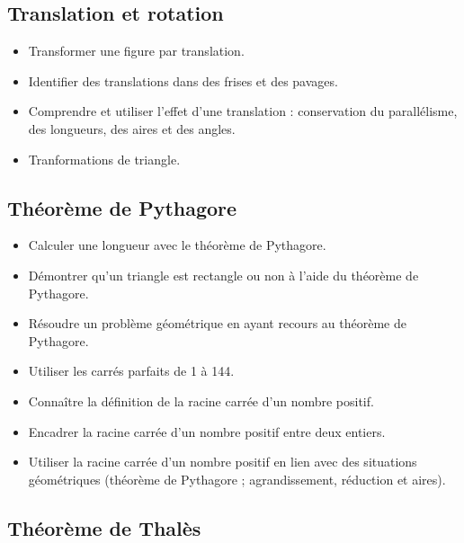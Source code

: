 \documentclass[a4paper,12pt,fleqn]{article}	
\begin{document}
\renewcommand{\labelitemi}{}

\subsection*{Translation et rotation}

\begin{itemize}
	\item {}Transformer une figure par translation.
	\item {}Identifier des translations dans des frises et des pavages.
	\item {}Comprendre et utiliser l’effet d’une translation : conservation du parallélisme, des longueurs, des aires et des angles.
	\item {}Tranformations de triangle.
\end{itemize}

\subsection*{Théorème de Pythagore}

\begin{itemize}
	\item {}Calculer une longueur avec le théorème de Pythagore.
	\item {}Démontrer qu'un triangle est rectangle ou non à l'aide du théorème de Pythagore.
	\item {}Résoudre un problème géométrique en ayant recours au théorème de Pythagore.
	\item {}Utiliser les carrés parfaits de 1 à 144.
	\item {}Connaître la définition de la racine carrée d’un nombre positif.
	\item {}Encadrer la racine carrée d’un nombre positif entre deux entiers.%
	\item {}Utiliser la racine carrée d’un nombre positif en lien avec des situations géométriques (théorème de Pythagore ; agrandissement, réduction et aires).
\end{itemize}

\subsection*{Théorème de Thalès}
\end{document}
